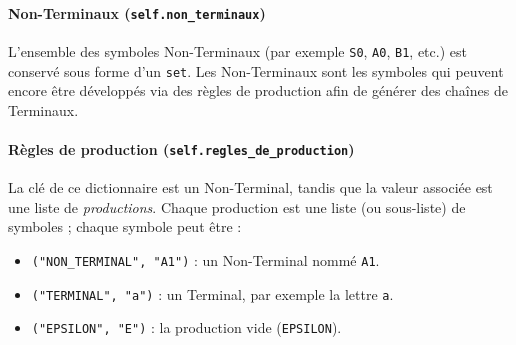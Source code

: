 \documentclass[a4paper,12pt]{article}
\begin{document}
\paragraph{Non-Terminaux (\texttt{self.non\_terminaux})}
L’ensemble des symboles Non-Terminaux (par exemple \texttt{S0}, \texttt{A0}, \texttt{B1}, etc.) est conservé sous forme d’un \texttt{set}. Les Non-Terminaux sont les symboles qui peuvent encore être développés via des règles de production afin de générer des chaînes de Terminaux.

\paragraph{Règles de production (\texttt{self.regles\_de\_production})}
La clé de ce dictionnaire est un Non-Terminal, tandis que la valeur associée est une liste de \emph{productions}. Chaque production est une liste (ou sous-liste) de symboles ; chaque symbole peut être :
\begin{itemize}
    \item \texttt{("NON\_TERMINAL", "A1")} : un Non-Terminal nommé \texttt{A1}.
    \item \texttt{("TERMINAL", "a")} : un Terminal, par exemple la lettre \texttt{a}.
    \item \texttt{("EPSILON", "E")} : la production vide (\texttt{EPSILON}).
\end{itemize}

\end{document}

